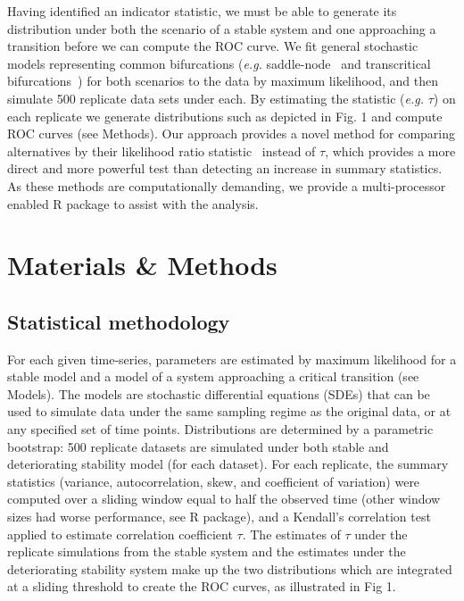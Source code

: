 \documentclass[authoryear,preprint,11pt]{elsarticle}
\begin{document}
Having identified an indicator statistic,
we must be able to generate its distribution under both the scenario of a stable system and 
one approaching a transition before we can compute the ROC curve.
We fit general stochastic models representing common bifurcations
(\emph{e.g.} saddle-node~\citep{Scheffer2009, Guttal2008a, VanNes2007, Biggs2009} and transcritical bifurcations~\citep{Drake2010})
for both scenarios to the data by maximum likelihood, and then simulate 500 replicate data sets under each⁠. 
By estimating the statistic (\emph{e.g.} $\tau$) on each replicate we generate distributions such as depicted in Fig. 1 and compute ROC curves (see Methods).
Our approach provides a novel method for comparing alternatives by their likelihood ratio statistic~\citep{Cox1961}⁠ instead of $\tau$,
which provides a more direct and more powerful test than detecting an increase in summary statistics.
As these methods are computationally demanding, we provide a multi-processor enabled R package to assist with the analysis. 

\section{Materials \& Methods}\label{methods}

\subsection{Statistical methodology}
For each given time-series, parameters are estimated by maximum likelihood 
for a stable model and a model of a system approaching a critical transition (see Models).
The models are stochastic differential equations (SDEs)
that can be used to simulate data under the same sampling regime as the original data, 
or at any specified set of time points.
Distributions are determined by a parametric bootstrap:
500 replicate datasets are simulated under both stable and deteriorating stability model (for each dataset).
For each replicate, the summary statistics (variance, autocorrelation, skew, and coefficient of variation)
were computed over a sliding window equal to half the observed time (other window sizes had worse performance, see R package), 
and a Kendall's correlation test applied to estimate correlation coefficient $\tau$.
The estimates of $\tau$ under the replicate simulations from the stable system
and the estimates under the deteriorating stability system
make up the two distributions which are integrated at a sliding threshold to create the ROC curves, as illustrated in Fig 1. 
\end{document}
